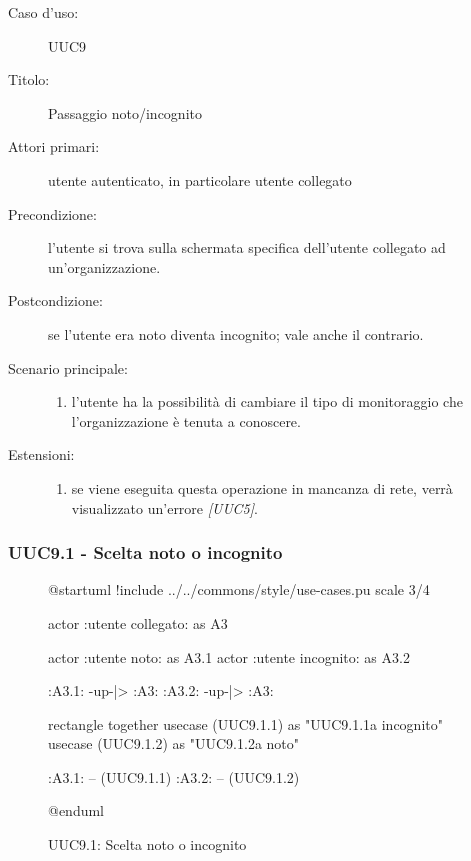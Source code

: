 \documentclass[casi-duso]{subfiles}
\begin{document}
\begin{description}
  \item[Caso d’uso:] UUC9
  \item[Titolo:] Passaggio noto/incognito
  \item[Attori primari:] utente autenticato, in particolare utente collegato
  \item[Precondizione:] l'utente si trova sulla schermata specifica dell'utente collegato ad un'organizzazione.
  \item[Postcondizione:] se l'utente era noto diventa incognito; vale anche il contrario.
  \item[Scenario principale:]
        \begin{enumerate}
          \item l'utente ha la possibilità di cambiare il tipo di monitoraggio che l'organizzazione è tenuta a conoscere.
        \end{enumerate}
  \item[Estensioni:]
        \begin{enumerate}
          \item se viene eseguita questa operazione in mancanza di rete, verrà visualizzato un'errore \emph{[UUC5]}.
        \end{enumerate}
\end{description}

\subsubsection{UUC9.1 - Scelta noto o incognito}%
\label{subsub:UUC9.1utente}

\begin{figure}[h!]
  \centering
  \begin{plantuml}
  @startuml
  !include ../../commons/style/use-cases.pu
  scale 3/4

  actor :utente collegato: as A3

  actor :utente noto: as A3.1
  actor :utente incognito: as A3.2

  :A3.1: -up-|> :A3:
  :A3.2: -up-|> :A3:

  rectangle {
    together {
      usecase (UUC9.1.1) as "UUC9.1.1\nPassaggio a incognito"
      usecase (UUC9.1.2) as "UUC9.1.2\nPassaggio a noto"
    }
  }

  :A3.1: -- (UUC9.1.1)
  :A3.2: -- (UUC9.1.2)

  @enduml
  \end{plantuml}
  \caption{UUC9.1: Scelta noto o incognito}
  \label{fig:uuc9_1}
\end{figure}
\end{document}
